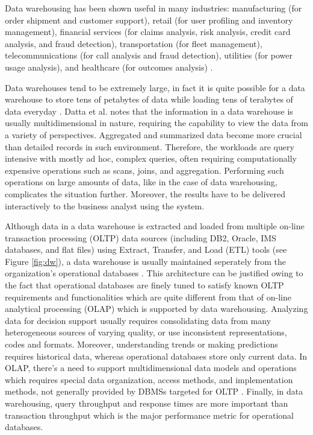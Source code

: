 \documentclass[12pt,a4paper]{article}
\begin{document}
Data warehousing has been shown useful in many industries: manufacturing (for order shipment and customer support), retail (for user profiling and inventory
management), financial services (for claims analysis, risk analysis, credit card analysis, and fraud detection), transportation (for fleet management),
telecommunications (for call analysis and fraud detection), utilities (for power usage analysis), and healthcare (for outcomes analysis)
\cite{chaudhuri1997overview}.

Data warehouses tend to be extremely large, in fact it is quite possible for a data warehouse to store tens of petabytes of data while loading tens of terabytes
of data everyday \cite{thusoo2010data}. Datta et al. \cite {628286} notes that the information in a data warehouse is usually multidimensional in nature,
requiring the capability to view the data from a variety of perspectives. Aggregated and summarized data become more crucial than detailed records in such
environment. Therefore, the workloads are query intensive with mostly ad hoc, complex queries, often requiring computationally expensive operations such as
scans, joins, and aggregation. Performing such operations on large amounts of data, like in the case of data warehousing, complicates the situation further.
Moreover, the results have to be delivered interactively to the business analyst using the system.


Although data in a data warehouse is extracted and loaded from multiple on-line transaction processing (OLTP) data sources (including DB2, Oracle, IMS
databases, and flat files) using Extract, Transfer, and Load (ETL) tools (see Figure \ref{fig:dw}), a data warehouse is usually maintained seperately from the
organization's operational databases \cite{sen2005comparison, chaudhuri1997overview}. This architecture can be justified owing to the fact that operational
databases are finely tuned to satisfy known OLTP requirements and functionalities which are quite different from that of on-line analytical processing (OLAP)
which is supported by data warehousing. Analyzing data for decision support usually requires consolidating data from many heterogeneous sources of varying
quality, or use inconsistent representations, codes and formats. Moreover, understanding trends or making predictions requires historical data, whereas
operational databases store only current data. In OLAP, there's a need to support multidimensional data models and operations which requires special data
organization, access methods, and implementation methods, not generally provided by DBMSs targeted for OLTP \cite{chaudhuri1997overview}. Finally, in data
warehousing, query throughput and response times are more important than transaction throughput which is the major performance metric for operational databases.
\end{document}
